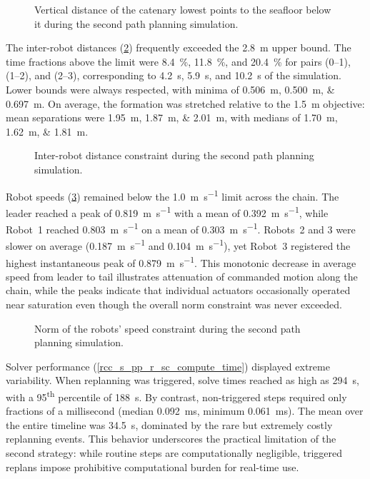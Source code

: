 \begin{figure}
	\centering
	\caption{Vertical distance of the catenary lowest points to the seafloor below it during the second path planning simulation.}
	\label{rcc_s_pp_r_sc_lowest_point}
\end{figure}

The inter-robot distances (\cref{rcc_s_pp_r_sc_inter_robot_distance}) frequently exceeded the
\qty{2.8}{\m} upper bound. The time fractions above the limit were \qty{8.4}{\percent},
\qty{11.8}{\percent}, and \qty{20.4}{\percent} for pairs (0--1), (1--2), and (2--3), corresponding
to \qty{4.2}{\s}, \qty{5.9}{\s}, and \qty{10.2}{\s} of the simulation. Lower bounds were always
respected, with minima of \qtylist{0.506;0.500;0.697}{\m}. On average, the formation was stretched
relative to the \qty{1.5}{\m} objective: mean separations were \qtylist{1.95;1.87;2.01}{\m}, with
medians of \qtylist{1.70;1.62;1.81}{\m}.

\begin{figure}
	\centering
	\caption{Inter-robot distance constraint during the second path planning simulation.}
	\label{rcc_s_pp_r_sc_inter_robot_distance}
\end{figure}

Robot speeds (\cref{rcc_s_pp_r_sc_robots_speed}) remained below the \qty{1.0}{\m\per\s} limit
across the chain. The leader reached a peak of \qty{0.819}{\m\per\s} with a mean of
\qty{0.392}{\m\per\s}, while Robot~1 reached \qty{0.803}{\m\per\s} on a mean of
\qty{0.303}{\m\per\s}. Robots~2 and 3 were slower on average (\qty{0.187}{\m\per\s} and
\qty{0.104}{\m\per\s}), yet Robot~3 registered the highest instantaneous peak of
\qty{0.879}{\m\per\s}. This monotonic decrease in average speed from leader to tail illustrates
attenuation of commanded motion along the chain, while the peaks indicate that individual actuators
occasionally operated near saturation even though the overall norm constraint was never exceeded.

\begin{figure}
	\centering
	\caption{Norm of the robots' speed constraint during the second path planning simulation.}
	\label{rcc_s_pp_r_sc_robots_speed}
\end{figure}

Solver performance (\cref{rcc_s_pp_r_sc_compute_time}) displayed extreme variability. When
replanning was triggered, solve times reached as high as \qty{294}{\s}, with a
95\textsuperscript{th} percentile of \qty{188}{\s}. By contrast, non-triggered steps required only
fractions of a millisecond (median \qty{0.092}{\milli\second}, minimum \qty{0.061}{\milli\second}).
The mean over the entire timeline was \qty{34.5}{\s}, dominated by the rare but extremely costly
replanning events. This behavior underscores the practical limitation of the second strategy: while
routine steps are computationally negligible, triggered replans impose prohibitive computational
burden for real-time use.

